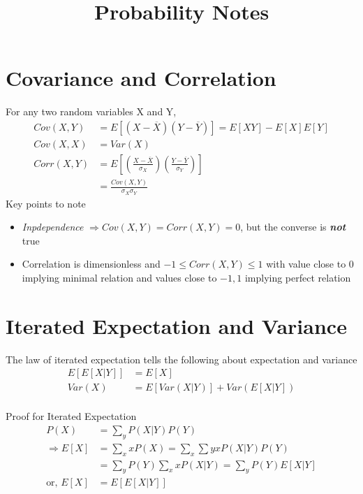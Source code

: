 \documentclass[11pt, a4paper]{article}
\title{Probability Notes}
\begin{document}
    \maketitle{}
    \tableofcontents
    \newpage

    



    \section{Covariance and Correlation}
    For any two random variables X and Y,
    \begin{align*}
        Cov(X,Y) &= E[(X - \overline{X})(Y - \overline{Y})] = E[XY] - E[X]E[Y]\\
        Cov(X,X) &= Var(X)\\
        Corr(X,Y) &= E[(\frac{X - \overline{X}}{\sigma_{X}}) (\frac{Y - \overline{Y}}{\sigma_{Y}})]\\
        &= \frac{Cov(X,Y)}{\sigma_{X} \sigma_{Y}}
    \end{align*}
    Key points to note
    \begin{itemize}
        \item \emph{Inpdependence} $\Rightarrow Cov(X,Y) = Corr(X,Y) = 0$, but the converse is \emph{\textbf{not}} true
        \item Correlation is dimensionless and $-1 \leq Corr(X,Y) \leq 1$ with value close to $0$ implying minimal relation and values close to $-1, 1$ implying perfect relation
    \end{itemize}

    \section{Iterated Expectation and Variance}
    The law of iterated expectation tells the following about expectation and variance
    \begin{align*}
        E[E[X|Y]] &= E[X] \\
        Var(X) &= E[Var(X|Y)] + Var(E[X|Y])\\
    \end{align*}

    Proof for Iterated Expectation
    \begin{align*}
        P(X) &= \sum_{y} P(X|Y) P(Y) \\
        \Rightarrow E[X] &= \sum_{x} xP(X) = \sum_{x} \sum{y} xP(X|Y)P(Y) \\
            &= \sum_{y} P(Y) \sum_{x} xP(X|Y) = \sum_{y} P(Y) E[X|Y] \\
        \text{or, } E[X] &= E[E[X|Y]] \tag*{$E[X|Y]$ is a function of $X$ and not $Y$}
    \end{align*}
    
\end{document}
